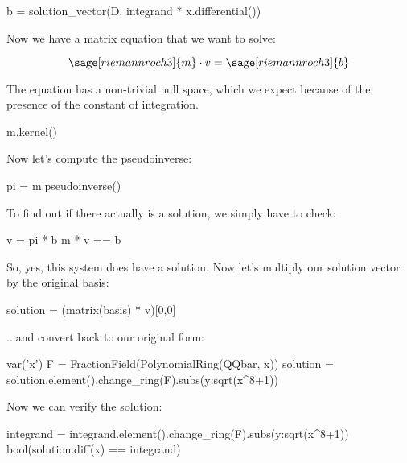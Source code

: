 \begin{sageblock}[riemannroch3]
b = solution_vector(D, integrand * x.differential())
\end{sageblock}

Now we have a matrix equation that we want to solve:

$$\sage[riemannroch3]{m} \cdot v = \sage[riemannroch3]{b}$$

The equation has a non-trivial null space, which we expect because
of the presence of the constant of integration.

\begin{sageblock}[riemannroch3]
m.kernel()
\end{sageblock}

Now let's compute the pseudoinverse:

\begin{sageblock}[riemannroch3]
pi = m.pseudoinverse()
\end{sageblock}

To find out if there actually is a solution, we simply have to check:

\begin{sageblock}[riemannroch3]
v = pi * b
m * v == b
\end{sageblock}

So, yes, this system does have a solution.  Now let's multiply our
solution vector by the original basis:

\begin{sageblock}[riemannroch3]
solution = (matrix(basis) * v)[0,0]
\end{sageblock}

...and convert back to our original form:

\begin{sageblock}[riemannroch3]
var('x')
F = FractionField(PolynomialRing(QQbar, x))
solution = solution.element().change_ring(F).subs({y:sqrt(x^8+1)})
\end{sageblock}

Now we can verify the solution:

\begin{sageblock}[riemannroch3]
integrand = integrand.element().change_ring(F).subs({y:sqrt(x^8+1)})
bool(solution.diff(x) == integrand)
\end{sageblock}


